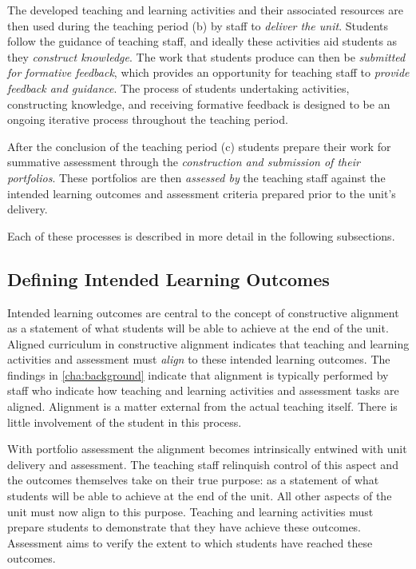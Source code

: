 The developed teaching and learning activities and their associated resources are then used during the teaching period (b) by staff to \emph{deliver the unit}. Students follow the guidance of teaching staff, and ideally these activities aid students as they \emph{construct knowledge}. The work that students produce can then be \emph{submitted for formative feedback}, which provides an opportunity for teaching staff to \emph{provide feedback and guidance}. The process of students undertaking activities, constructing knowledge, and receiving formative feedback is designed to be an ongoing iterative process throughout the teaching period.

After the conclusion of the teaching period (c) students prepare their work for summative assessment through the \emph{construction and submission of their portfolios}. These portfolios are then \emph{assessed by} the teaching staff against the intended learning outcomes and assessment criteria prepared prior to the unit's delivery.

Each of these processes is described in more detail in the following subsections.



\subsection{Defining Intended Learning Outcomes} %
\label{sub:defining_intended_learning_outcomes}

Intended learning outcomes are central to the concept of constructive alignment as a statement of what students will be able to achieve at the end of the unit. Aligned curriculum in constructive alignment indicates that teaching and learning activities and assessment must \emph{align} to these intended learning outcomes. The findings in \cref{cha:background} indicate that alignment is typically performed by staff who indicate how teaching and learning activities and assessment tasks are aligned. Alignment is a matter external from the actual teaching itself. There is little involvement of the student in this process.

With portfolio assessment the alignment becomes intrinsically entwined with unit delivery and assessment. The teaching staff relinquish control of this aspect and the outcomes themselves take on their true purpose: as a statement of what students will be able to achieve at the end of the unit. All other aspects of the unit must now align to this purpose. Teaching and learning activities must prepare students to demonstrate that they have achieve these outcomes. Assessment aims to verify the extent to which students have reached these outcomes.

